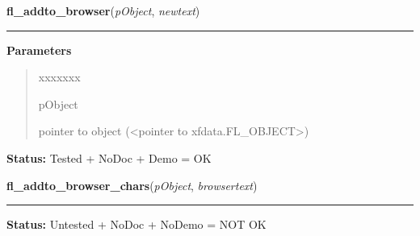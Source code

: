 \hspace{.8\funcindent}\begin{boxedminipage}{\funcwidth}

    \raggedright \textbf{fl\_addto\_browser}(\textit{pObject}, \textit{newtext})

    \vspace{-1.5ex}

    \rule{\textwidth}{0.5\fboxrule}
\setlength{\parskip}{2ex}
\setlength{\parskip}{1ex}
      \textbf{Parameters}
      \vspace{-1ex}

      \begin{quote}
        \begin{Ventry}{xxxxxxx}

          \item[pObject]

          pointer to object ({\textless}pointer to 
          xfdata.FL\_OBJECT{\textgreater})

        \end{Ventry}

      \end{quote}

\textbf{Status:} Tested + NoDoc + Demo = OK



    \end{boxedminipage}

    \label{xformslib:library:fl_addto_browser_chars}

    \vspace{0.5ex}

\hspace{.8\funcindent}\begin{boxedminipage}{\funcwidth}

    \raggedright \textbf{fl\_addto\_browser\_chars}(\textit{pObject}, \textit{browsertext})

    \vspace{-1.5ex}

    \rule{\textwidth}{0.5\fboxrule}
\setlength{\parskip}{2ex}
\setlength{\parskip}{1ex}
\textbf{Status:} Untested + NoDoc + NoDemo = NOT OK



    \end{boxedminipage}

    \label{xformslib:library:fl_addto_browser_chars}

